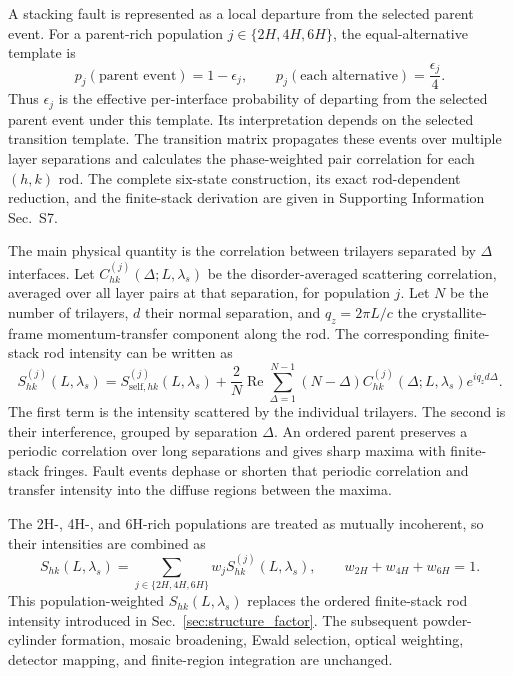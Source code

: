 A stacking fault is represented as a local departure from the selected parent event. For a parent-rich population $j\in\{2H,4H,6H\}$, the equal-alternative template is
\begin{equation}
  p_j(\text{parent event})=1-\epsilon_j,
  \qquad
  p_j(\text{each alternative})=\frac{\epsilon_j}{4}.
  \label{eq:pbi2_fault_parameterization}
\end{equation}
Thus $\epsilon_j$ is the effective per-interface probability of departing from the selected parent event under this template. Its interpretation depends on the selected transition template. The transition matrix propagates these events over multiple layer separations and calculates the phase-weighted pair correlation for each $(h,k)$ rod. The complete six-state construction, its exact rod-dependent reduction, and the finite-stack derivation are given in Supporting Information Sec.~S7.\cite{HendricksTeller1942,KakinokiKomura1954,KakinokiKomura1965,Hart2018}

The main physical quantity is the correlation between trilayers separated by $\Delta$ interfaces. Let $C_{hk}^{(j)}(\Delta;L,\lambda_s)$ be the disorder-averaged scattering correlation, averaged over all layer pairs at that separation, for population $j$. Let $N$ be the number of trilayers, $d$ their normal separation, and $q_z=2\pi L/c$ the crystallite-frame momentum-transfer component along the rod. The corresponding finite-stack rod intensity can be written as
\begin{equation}
  S_{hk}^{(j)}(L,\lambda_s)
  =S_{\mathrm{self},hk}^{(j)}(L,\lambda_s)
  +\frac{2}{N}\operatorname{Re}\sum_{\Delta=1}^{N-1}
  (N-\Delta)C_{hk}^{(j)}(\Delta;L,\lambda_s)e^{iq_zd\Delta}.
  \label{eq:pbi2_pair_correlation_intensity}
\end{equation}
The first term is the intensity scattered by the individual trilayers. The second is their interference, grouped by separation $\Delta$. An ordered parent preserves a periodic correlation over long separations and gives sharp maxima with finite-stack fringes. Fault events dephase or shorten that periodic correlation and transfer intensity into the diffuse regions between the maxima.

The 2H-, 4H-, and 6H-rich populations are treated as mutually incoherent, so their intensities are combined as
\begin{equation}
  S_{hk}(L,\lambda_s)=
  \sum_{j\in\{2H,4H,6H\}}w_jS_{hk}^{(j)}(L,\lambda_s),
  \qquad w_{2H}+w_{4H}+w_{6H}=1.
  \label{eq:pbi2_population_sum}
\end{equation}
This population-weighted $S_{hk}(L,\lambda_s)$ replaces the ordered finite-stack rod intensity introduced in Sec.~\ref{sec:structure_factor}. The subsequent powder-cylinder formation, mosaic broadening, Ewald selection, optical weighting, detector mapping, and finite-region integration are unchanged.

